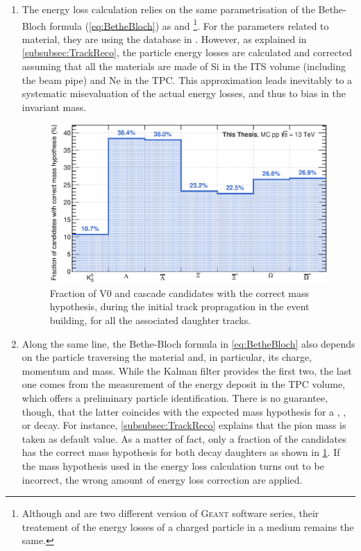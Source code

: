 \begin{enumerate}
\item The energy loss calculation relies on the same parametrisation of the Bethe-Bloch formula (\eq\ref{eq:BetheBloch}) as \GeantThree and \GeantFour\footnote{Although \GeantThree and \GeantFour are two different version of \textsc{Geant} software series, their treatement of the energy losses of a charged particle in a medium remains the same.}. For the parameters related to material, they are using the database in \cite{geant4Geant4MaterialDatabase}. However, as explained in \Sec\ref{subsubsec:TrackReco}, the particle energy losses are calculated and corrected assuming that all the materials are made of Si in the ITS volume (including the beam pipe) and Ne in the TPC. This approximation leads inevitably to a systematic misevaluation of the actual energy losses, and thus to bias in the invariant mass.

\begin{figure}[H]
	\centering
	\includegraphics[width=1\textwidth]{Figs/Chapter5/FractionOfPIDForTracking.eps}
	\caption{Fraction of V0 and cascade candidates with the correct mass hypothesis, during the initial track propragation in the event building, for all the associated daughter tracks.}
	\label{fig:FractionOfPIDForTracking}
\end{figure}

\item Along the same line, the Bethe-Bloch formula in \eq\ref{eq:BetheBloch} also depends on the particle traversing the material and, in particular, its charge, momentum and mass. While the Kalman filter provides the first two, the last one comes from the measurement of the energy deposit in the TPC volume, which offers a preliminary particle identification. There is no guarantee, though, that the latter coincides with the expected mass hypothesis  for a \rmKzeroS, \rmLambdaPM, \rmXiPM or \rmOmegaPM decay. For instance, \Sec\ref{subsubsec:TrackReco} explains that the pion mass is taken as default value. As a matter of fact, only a fraction of the candidates has the correct mass hypothesis for both decay daughters as shown in \fig\ref{fig:FractionOfPIDForTracking}. If the mass hypothesis used in the energy loss calculation turns out to be incorrect, the wrong amount of energy loss correction are applied.

\end{enumerate}


